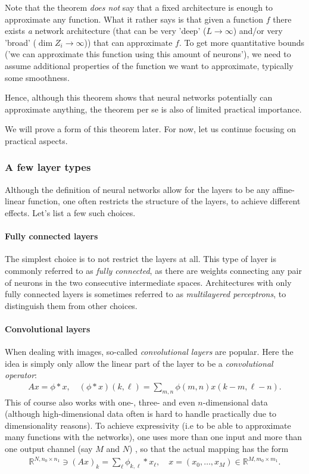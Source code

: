 \documentclass{article}
\newcommand{\R}{\mathbb{R}}
\begin{document}
Note that the theorem \emph{does not} say that a fixed architecture is enough to approximate any function. What it rather says is that given a function $f$ there exists \emph{a} network architecture (that can be very 'deep' ($L \to \infty$) and/or very 'broad' ($\dim Z_i \to \infty$)) that can approximate $f$. To get more quantitative bounds ('we can approximate this function using this amount of neurons'), we need to assume additional properties of the function we want to approximate, typically some smoothness.

Hence, although this theorem shows that neural networks potentially can approximate anything, the theorem per se is also of limited practical importance.

We will prove a form of this theorem later. For now, let us continue focusing on practical aspects.




\subsubsection{A few layer types}
Although the definition of neural networks allow for the layers to be any affine-linear function, one often restricts the structure of the layers, to achieve different effects. Let's list a few such choices.

\paragraph{Fully connected layers} The simplest choice is to not restrict the layers at all. This type of layer is commonly referred to as \emph{fully connected}, as there are weights connecting any pair of neurons in the two consecutive intermediate spaces. Architectures with only fully connected layers is sometimes referred to as \emph{multilayered perceptrons}, to distinguish them from other choices.

\paragraph{Convolutional layers} When dealing with images, so-called \emph{convolutional layers} are popular. Here the idea is simply only allow the linear part of the layer to be a \emph{convolutional operator}:
\begin{align*}
    Ax = \phi*x , \quad (\phi*x)(k,\ell) = \sum_{m,n}\phi(m,n)x({k-m,\ell-n}).
\end{align*}
This of course also works with one-, three- and even $n$-dimensional data (although high-dimensional data often is hard to handle practically due to dimensionality reasons). To achieve expressivity (i.e to be able to approximate many functions with the networks), one uses more than one input and more than one output channel (say $M$ and $N$) , so that the actual mapping has the form
\begin{align*}
    \R^{N,n_0 \times n_1} \ni (Ax)_k = \sum_{\ell} \phi_{k,\ell}*x_\ell, \quad x = (x_0, \dots, x_M) \in \R^{M,m_0 \times m_1}.
\end{align*}
\end{document}
